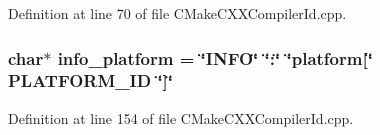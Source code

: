 Definition at line 70 of file CMakeCXXCompilerId.cpp.
\subsubsection{\setlength{\rightskip}{0pt plus 5cm}char$\ast$ {\bf info\_\-platform} = \char`\"{}INFO\char`\"{} \char`\"{}:\char`\"{} \char`\"{}platform[\char`\"{} PLATFORM\_\-ID \char`\"{}]\char`\"{}}\label{CMakeCXXCompilerId_8cpp_bfa30dab5bd89c85774e2aaaca5262d1}




Definition at line 154 of file CMakeCXXCompilerId.cpp.